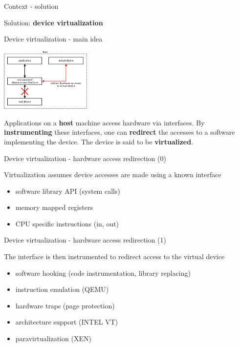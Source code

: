 \documentclass{beamer}
\begin{document}
\begin{frame}{Context - solution}
  \begin{center} Solution: \textbf{device virtualization} \end{center}
\end{frame}

\begin{frame}{Device virtualization - main idea}
  \begin{center}
    \includegraphics[width=45mm]{pic/dv_redirect/main.jpeg}
  \end{center}
  \begin{small}
    Applications on a \textbf{host} machine access hardware via interfaces. By
    \textbf{instrumenting} these interfaces, one can \textbf{redirect} the accesses
    to a software implementing the device. The device is said to be
    \textbf{virtualized}.
  \end{small}
\end{frame}

\begin{frame}{Device virtualization - hardware access redirection (0)}
  \begin{small}
  Virtualization assumes device accesses are made using a known interface
  \begin{itemize}
  \item software library API (system calls)
  \item memory mapped registers
  \item CPU specific instructions (in, out)
  \end{itemize}
  \end{small}
\end{frame}

\begin{frame}{Device virtualization - hardware access redirection (1)}
  \begin{small}
  The interface is then instrumented to redirect access to the virtual device
  \begin{itemize}
  \item software hooking (code instrumentation, library replacing)
  \item instruction emulation (QEMU)
  \item hardware traps (page protection)
  \item architecture support (INTEL VT)
  \item paravirtualization (XEN)
  \end{itemize}
  \end{small}
\end{frame}
\end{document}
